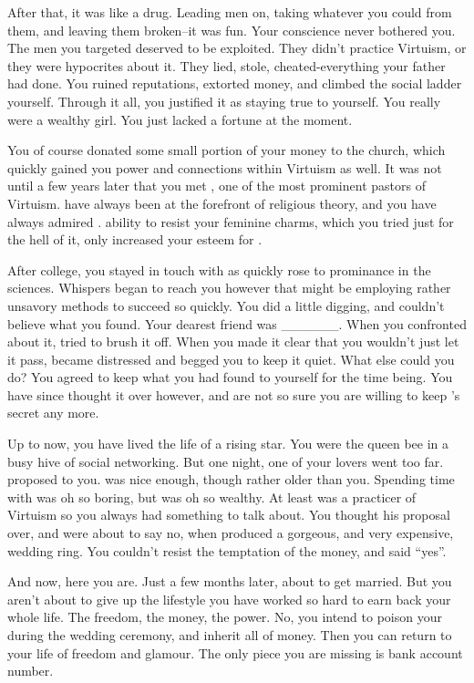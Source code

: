 \documentclass[char]{guildcamp1}
\begin{document}
After that, it was like a drug. Leading men on, taking whatever you could from them, and leaving them broken--it was fun. Your conscience never bothered you. The men you targeted deserved to be exploited. They didn't practice Virtuism, or they were hypocrites about it. They lied, stole, cheated-everything your father had done. You ruined reputations, extorted money, and climbed the social ladder yourself. Through it all, you justified it as staying true to yourself. You really were a wealthy girl. You just lacked a fortune at the moment.  

You of course donated some small portion of your money to the church, which quickly gained you power and connections within Virtuism as well. It was not until a few years later that you met \cPastor{}, one of the most prominent pastors of Virtuism.  have always been at the forefront of religious theory, and you have always admired .  ability to resist your feminine charms, which you tried just for the hell of it, only increased your esteem for \cPastor. 

After college, you stayed in touch with \cRival{} as  quickly rose to prominance in the sciences. Whispers began to reach you however that \cRival{} might be employing rather unsavory methods to succeed so quickly. You did a little digging, and couldn't believe what you found. Your dearest friend was ______. When you confronted  about it,  tried to brush it off. When you made it clear that you wouldn't just let it pass, \cRival{} became distressed and begged you to keep it quiet.  What else could you do? You agreed to keep what you had found to yourself for the time being. You have since thought it over however, and are not so sure you are willing to keep \cRival{}'s secret any more.

Up to now, you have lived the life of a rising star. You were the queen bee in a busy hive of social networking. But one night, one of your lovers went too far. \cGroom{} proposed to you.  was nice enough, though rather older than you. Spending time with  was oh so boring, but  was oh so wealthy. At least  was  a practicer of Virtuism so you always had something to talk about. You thought his proposal over, and were about to say no, when  produced a gorgeous, and very expensive, wedding ring. You couldn't resist the temptation of the money, and said ``yes''.

And now, here you are. Just a few months later, about to get married. But you aren't about to give up the lifestyle you have worked so hard to earn back your whole life. The freedom, the money, the power. No, you intend to poison your   during the wedding ceremony, and inherit all of  money. Then you can return to your life of freedom and glamour.  The only piece you are missing is  bank account number. 
\end{document}
